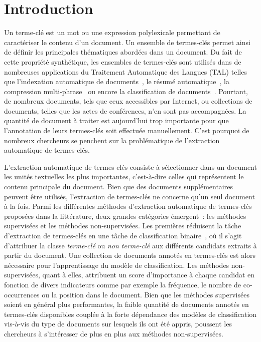 \section{Introduction}
\label{sec:introduction}
  Un terme-clé est un mot ou une expression polylexicale permettant de
  caractériser le contenu d'un document. Un ensemble de termes-clés permet ainsi
  de définir les principales thématiques abordées dans un document. Du fait de
  cette propriété synthétique, les ensembles de termes-clés sont utilisés dans
  de nombreuses applications du Traitement Automatique des Langues (TAL) telles
  que l'indexation automatique de documents~\cite{medelyan2008smalltrainingset},
  le résumé automatique~\cite{avanzo2005keyphrase}, la compression
  multi-phrase~\cite{boudin2013multisentencecompression} ou encore la
  classification de documents~\cite{han2007webdocumentclustering}.
  Pourtant, de nombreux documents, tels que ceux accessibles par Internet, ou
  collections de documents, telles que les actes de conférences, n'en sont pas
  accompagnées. La quantité de document à traiter est aujourd'hui trop
  importante pour que l'annotation de leurs termes-clés soit effectuée
  manuellement. C'est pourquoi de nombreux chercheurs se penchent sur la
  problématique de l'extraction automatique de termes-clés.

  L'extraction automatique de termes-clés consiste à sélectionner dans un
  document les unités textuelles les plus importantes, c'est-à-dire celles qui
  représentent le contenu principale du document. Bien que des documents
  supplémentaires peuvent être utilisés, l'extraction de termes-clés ne concerne
  qu'un seul document à la fois. Parmi les différentes méthodes d'extraction
  automatique de termes-clés proposées dans la littérature, deux grandes
  catégories émergent~: les méthodes supervisées et les méthodes
  non-supervisées. Les premières réduisent la tâche d'extraction de termes-clés
  en une tâche de classification binaire~\cite{witten1999kea}, où il s'agit
  d'attribuer la classe \og{}\textit{terme-clé}\fg{} ou \og{}\textit{non
  terme-clé}\fg{} aux différents candidats extraits à partir du document. Une
  collection de documents annotés en termes-clés est alors nécessaire pour
  l'apprentissage du modèle de classification. Les méthodes non-supervisées,
  quant à elles, attribuent un score d'importance à chaque candidat en fonction
  de divers indicateurs comme par exemple la fréquence, le nombre de
  co-occurrences ou la position dans le document. Bien que les méthodes
  supervisées soient en général plus performantes, la faible quantité de
  documents annotés en termes-clés disponibles couplée à la forte dépendance des
  modèles de classification vis-à-vis du type de documents sur lesquels ils ont
  été appris, poussent les chercheurs à s'intéresser de plus en plus aux
  méthodes non-supervisées.

